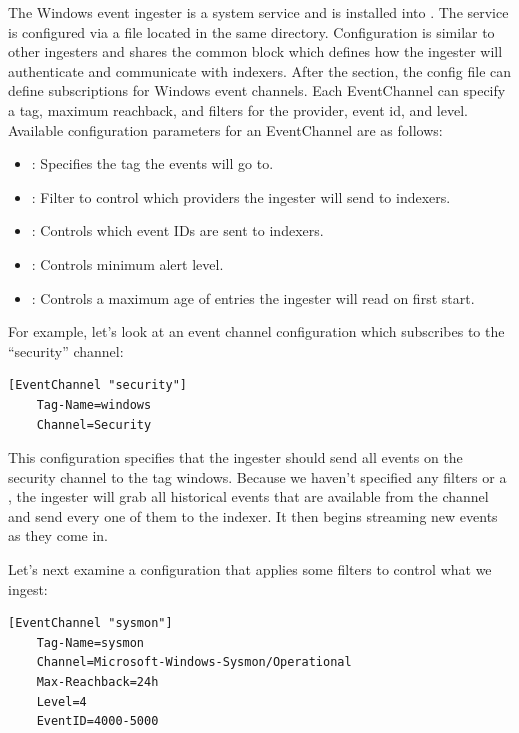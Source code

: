 The Windows event ingester is a system service and is installed into
. The service is configured
via a  file located in the same directory. Configuration
is similar to other ingesters and shares the common
\code{[Global]} block which defines how the ingester will authenticate
and communicate with indexers. After the \code{[Global]} section, the config
file can define subscriptions for Windows event channels. Each EventChannel can
specify a tag, maximum reachback, and filters for the provider, event
id, and level. Available configuration parameters for an EventChannel
are as follows:

\begin{itemize}
\item {}: Specifies the tag the events will go to.
\item {}: Filter to control which providers the ingester will send to indexers.
\item {}: Controls which event IDs are sent to indexers.
\item {}: Controls minimum alert level.
\item {}: Controls a maximum age of entries the ingester will read on first start.
\end{itemize}

For example, let's look at an event channel configuration which
subscribes to the ``security'' channel:

\begin{Verbatim}[breaklines=true]
[EventChannel "security"]
    Tag-Name=windows
    Channel=Security
\end{Verbatim}

This configuration specifies that the ingester should send all events
on the security channel to the tag windows. Because we haven't
specified any filters or a , the ingester will grab all
historical events that are available from the  channel and
send every one of them to the indexer. It then begins streaming new
events as they come in.

Let's next examine a configuration that applies some
filters to control what we ingest:

\begin{Verbatim}[breaklines=true]
[EventChannel "sysmon"]
    Tag-Name=sysmon
    Channel=Microsoft-Windows-Sysmon/Operational
    Max-Reachback=24h
    Level=4
    EventID=4000-5000
\end{Verbatim}

